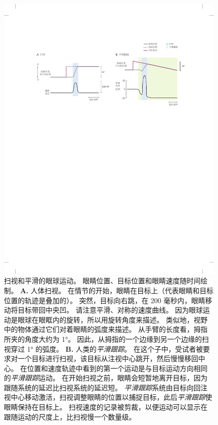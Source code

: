 \begin{figure}[htbp]
	\centering
	\includegraphics[width=1.0\linewidth]{chap35/fig_35_6}
	\caption{扫视和平滑的眼球运动。
		眼睛位置、目标位置和眼睛速度随时间绘制。
		\textbf{A.} 人体扫视。
		在情节的开始，眼睛在目标上（代表眼睛和目标位置的轨迹是叠加的）。
		突然，目标向右跳，在 200 毫秒内，眼睛移动将目标带回中央凹。
		请注意平滑、对称的速度曲线。
		因为眼球运动是眼球在眼眶内的旋转，所以用旋转角度来描述。
		类似地，视野中的物体通过它们对着眼睛的弧度来描述。
		从手臂的长度看，拇指所夹的角度大约为 1°。
		因此，从拇指的一个边缘到另一个边缘的扫视穿过 1° 的弧度。
		\textbf{B.} 人类的\textit{平滑跟踪}。
		在这个子中，受试者被要求对一个目标进行扫视，该目标从注视中心跳开，然后慢慢移回中心。
		在位置和速度轨迹中看到的第一个运动是与目标运动方向相同的\textit{平滑跟踪}运动。
		在开始扫视之前，眼睛会短暂地离开目标，因为跟随系统的延迟比扫视系统的延迟短。
		\textit{平滑跟踪}系统由目标向回注视中心移动激活，扫视调整眼睛的位置以捕捉目标，此后\textit{平滑跟踪}使眼睛保持在目标上。
		扫视速度的记录被剪裁，以便运动可以显示在跟随运动的尺度上，比扫视慢一个数量级。}
	\label{fig:35_6}
\end{figure}


